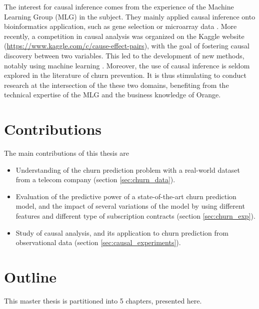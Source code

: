 The interest for causal inference comes from the experience of the Machine
Learning Group (MLG) in the subject. They mainly applied causal inference onto
bioinformatics application, such as gene selection
\parencite{bontempi2011multiple} or microarray data
\parencite{bontempi2010causal}. More recently, a competition in causal analysis
was organized on the Kaggle website
(\url{https://www.kaggle.com/c/cause-effect-pairs}), with the goal of fostering
causal discovery between two variables. This led to the development of new
methods, notably using machine learning \parencite{bontempi2015dependency}.
Moreover, the use of causal inference is seldom explored in the literature of
churn prevention. It is thus stimulating to conduct research at the intersection
of the these two domains, benefiting from the technical expertise of the MLG and
the business knowledge of Orange.

\section{Contributions}
The main contributions of this thesis are
\begin{itemize}
    \item Understanding of the churn prediction problem with a real-world
    dataset from a telecom company (section \ref{sec:churn_data}).
    \item Evaluation of the predictive power of a state-of-the-art churn
    prediction model, and the impact of several variations of the model by using
    different features and different type of subscription contracts (section
    \ref{sec:churn_exp}).
    \item Study of causal analysis, and its application to churn prediction from
    observational data (section \ref{sec:causal_experiments}).
\end{itemize}

\section{Outline}

This master thesis is partitioned into 5 chapters, presented here.

